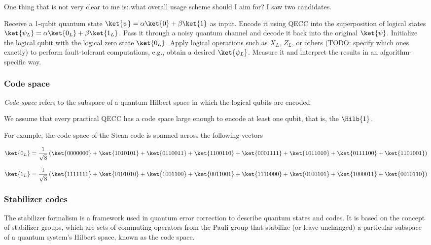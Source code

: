 \begin{QUESTION}
One thing that is not very clear to me is: what overall usage scheme should I aim for? I saw two
candidates.

\ls Receive a 1-qubit quantum state $\ket{\psi} = \alpha\ket{0} + \beta\ket{1}$ as input. Encode it
    using QECC into the superposition of logical states $\ket{\psi_L} = \alpha\ket{0_L} +
    \beta\ket{1_L}$. Pass it through a noisy quantum channel and decode it back into the original
    $\ket{\psi}$.
\li Initialize the logical qubit with the logical zero state $\ket{0_L}$. Apply logical operations
    such as $X_L$, $Z_L$, or others (TODO: specify which ones exactly) to perform fault-tolerant
    computations, e.g., obtain a desired $\ket{\psi_L}$. Measure it and interpret the results in an
    algorithm-specific way.
\le
\end{QUESTION}

\subsubsection*{Code space}

\textit{Code space} refers to the subspace of a quantum Hilbert space in which the logical qubits
are encoded.

We assume that every practical QECC has a code space large enough to encode at least one qubit, that
is, the $\Hilb{1}$.

\vsp

For example, the code space of the Stean code is spanned across the following vectors

\[
\ket{0_L} = \frac{1}{\sqrt{8}} \left( \ket{0000000} + \ket{1010101} + \ket{0110011} + \ket{1100110}
+ \ket{0001111} + \ket{1011010} + \ket{0111100} + \ket{1101001} \right)
\]

\vsp

\[
\ket{1_L} = \frac{1}{\sqrt{8}} \left( \ket{1111111} + \ket{0101010} + \ket{1001100} + \ket{0011001}
+ \ket{1110000} + \ket{0100101} + \ket{1000011} + \ket{0010110} \right)
\]


\subsubsection*{Stabilizer codes}

The stabilizer formalism is a framework used in quantum error correction to describe quantum states
and codes. It is based on the concept of stabilizer groups, which are sets of commuting operators
from the Pauli group that stabilize (or leave unchanged) a particular subspace of a quantum system's
Hilbert space, known as the code space.

